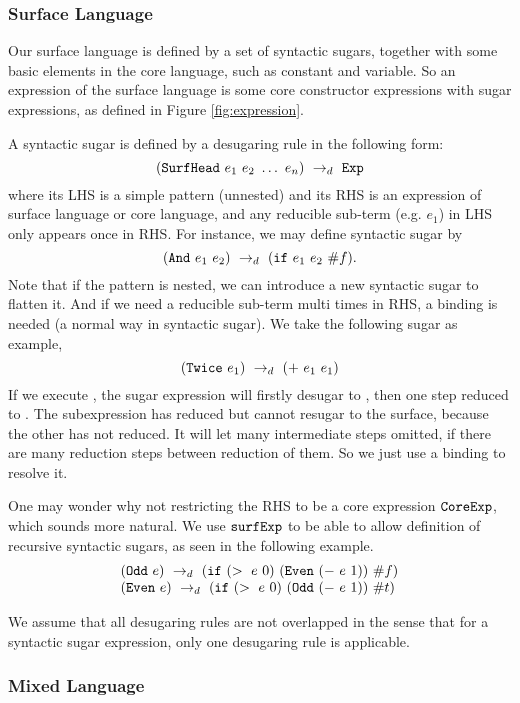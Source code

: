 \subsubsection{Surface Language}

Our surface language is defined by a set of syntactic sugars, together with some basic elements in the core language, such as constant and variable. So an expression of the surface language is some core constructor expressions with sugar expressions, as defined in Figure \ref{fig:expression}.

A syntactic sugar is defined by a desugaring rule in the following form:
\[
(\mbox{\tt SurfHead}~e_1~e_2~\ldots~e_n) ~\rightarrow_d~ \mbox{\tt Exp}
\]
where its LHS is a simple pattern (unnested) and its RHS is an expression of surface language or core language, and any reducible sub-term (e.g. $e_1$) in LHS only appears once in RHS. For instance, we may define syntactic sugar  by
\[
(\mbox{\tt And}~e_1~e_2) ~\rightarrow_d~ (\mbox{\tt if}~e_1~e_2~\#f).
\]
Note that if the pattern is nested, we can introduce a new syntactic sugar to flatten it. And if we need a reducible sub-term multi times in RHS, a  binding is needed (a normal way in syntactic sugar). We take the following sugar as example,
\[(\mbox{\tt Twice}~e_1) ~\rightarrow_d~ (+~e_1~e_1)\]
If we execute , the sugar expression will firstly desugar to , then one step reduced to . The subexpression  has reduced but cannot resugar to the surface, because the other  has not reduced. It will let many intermediate steps omitted, if there are many reduction steps between reduction of them. So we just use a  binding to resolve it.

One may wonder why  not restricting the RHS to be a core expression $\mbox{\tt CoreExp}$, which sounds more natural. We use $\mbox{\tt surfExp}$ to be able to allow definition of recursive syntactic sugars, as seen in the following example.
\[
\begin{array}{l}
(\mbox{\tt Odd}~e) ~\rightarrow_d~ (\mbox{\tt if}~(>~e~0)~(\mbox{\tt Even}~(-~e~1))~\#f)\\
(\mbox{\tt Even}~e) ~\rightarrow_d~ (\mbox{\tt if}~(>~e~0)~(\mbox{\tt Odd}~(-~e~1))~\#t)
\end{array}
\]

We assume that all desugaring rules are not overlapped in the sense that for a syntactic sugar expression, only one desugaring rule is applicable. 


\subsubsection{Mixed Language}

